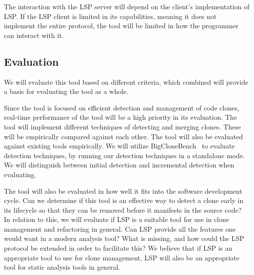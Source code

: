 The interaction with the LSP server will depend on the client's implementation of LSP. If
the LSP client is limited in its capabilities, meaning it does not implement the entire
protocol, the tool will be limited in how the programmer can interact with it.



\subsection{Evaluation}

We will evaluate this tool based on different criteria, which combined will provide a
basis for evaluating the tool as a whole.

Since the tool is focused on efficient detection and management of code clones, real-time
performance of the tool will be a high priority in its evaluation. The tool will implement
different techniques of detecting and merging clones. These will be empirically compared
against each other. The tool will also be evaluated against existing tools empirically. We
will utilize BigCloneBench~\cite{BigCloneBench} to evaluate detection techniques, by
running our detection techniques in a standalone mode. We will distinguish between initial
detection and incremental detection when evaluating.

The tool will also be evaluated in how well it fits into the software development cycle.
Can we determine if this tool is an effective way to detect a clone early in its lifecycle
so that they can be removed before it manifests in the source code? In relation to this,
we will evaluate if LSP is a suitable tool for use in clone management and refactoring in
general. Can LSP provide all the features one would want in a modern analysis tool? What
is missing, and how could the LSP protocol be extended in order to facilitate this? We
believe that if LSP is an appropriate tool to use for clone management, LSP will also be
an appropriate tool for static analysis tools in general.
